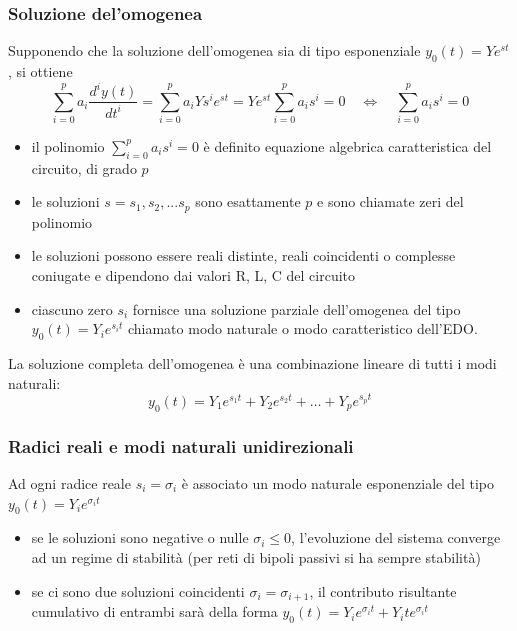\documentclass[a4paper]{article}
\begin{document}
\subsubsection*{Soluzione del'omogenea}
Supponendo che la soluzione dell'omogenea sia di tipo esponenziale \(y_0(t) = Ye^{st}\), si ottiene
\[\sum_{i=0}^{p} a_i \frac{d^i y(t)}{dt^i} = \sum_{i=0}^{p} a_i Y s^i e^{st} = Ye^{st} \sum_{i=0}^{p} a_i s^i = 0 \quad \Leftrightarrow \quad \sum_{i=0}^{p} a_i s^i = 0\]
\begin{itemize}
	\item il polinomio \(\sum_{i=0}^{p} a_i s^i = 0\) è definito equazione algebrica caratteristica del circuito, di grado \(p\)
	\item le soluzioni \(s = s_1, s_2, ... s_p\) sono esattamente \(p\) e sono chiamate zeri del polinomio
	\item le soluzioni possono essere reali distinte, reali coincidenti o complesse coniugate e dipendono dai valori R, L, C del circuito
	\item ciascuno zero \(s_i\) fornisce una soluzione parziale dell'omogenea del tipo \(y_0(t) = Y_i e ^{s_it}\) chiamato modo
	naturale o modo caratteristico dell'EDO.
\end{itemize}
La soluzione completa dell'omogenea è una combinazione lineare di tutti i modi naturali:
\[y_0(t) = Y_1e^{s_1t} + Y_2e^{s_2t} + \dots + Y_pe^{s_pt}\]

\subsubsection*{Radici reali e modi naturali unidirezionali}
Ad ogni radice reale \(s_i = \sigma_i\) è associato un modo naturale esponenziale del tipo \(y_0(t) = Y_i e^{\sigma_i t}\)
\begin{itemize}
	\item se le soluzioni sono negative o nulle \(\sigma_i \leq 0\), l'evoluzione del sistema converge ad un regime di stabilità (per reti di bipoli passivi si ha sempre stabilità)
	\item se ci sono due soluzioni coincidenti \(\sigma_{i} = \sigma_{i+1}\), il contributo risultante cumulativo di entrambi sarà della forma \(y_0(t) = Y_i e^{\sigma_i t} + Y_i t e^{\sigma_i t}\)
\end{itemize}
\end{document}
